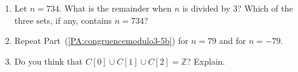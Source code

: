 \begin{previewactivity}
\begin{enumerate}
\begin{enumerate}
  \item Let  $n = 734$.  What is the remainder when  $n$ is divided by 3?  Which of the three sets, if any,  contains  $n = 734$?  
\label{PA:congruencemodulo3-5b}%

  \item Repeat Part~(\ref{PA:congruencemodulo3-5b}) for  $n = 79$ and for $n=-79$.


  \item Do you think that  
        $C[ 0 ] \cup C[ 1 ] \cup C[ 2 ] = \mathbb{Z}$?  Explain.
\end{enumerate}

\end{enumerate}
\end{previewactivity}
\hbreak


\endinput
